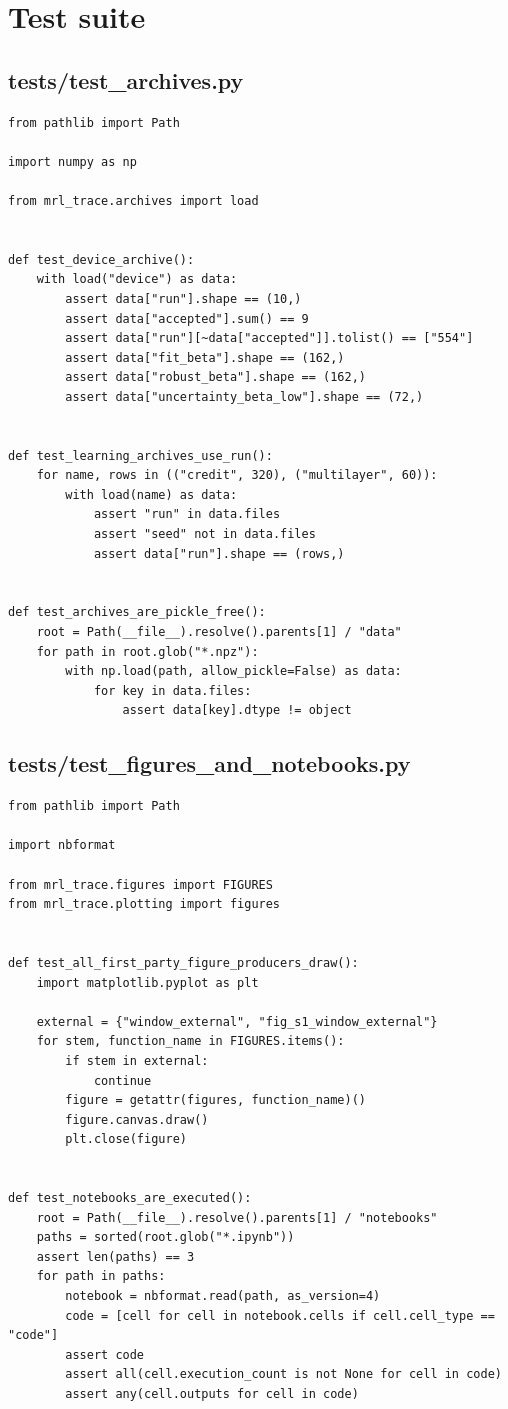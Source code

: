 \documentclass[a4paper,10pt]{article}
\begin{document}
\section{Test suite}
\label{sec:tests}
\subsection{tests/test\_archives.py}
\begin{Verbatim}
from pathlib import Path

import numpy as np

from mrl_trace.archives import load


def test_device_archive():
    with load("device") as data:
        assert data["run"].shape == (10,)
        assert data["accepted"].sum() == 9
        assert data["run"][~data["accepted"]].tolist() == ["554"]
        assert data["fit_beta"].shape == (162,)
        assert data["robust_beta"].shape == (162,)
        assert data["uncertainty_beta_low"].shape == (72,)


def test_learning_archives_use_run():
    for name, rows in (("credit", 320), ("multilayer", 60)):
        with load(name) as data:
            assert "run" in data.files
            assert "seed" not in data.files
            assert data["run"].shape == (rows,)


def test_archives_are_pickle_free():
    root = Path(__file__).resolve().parents[1] / "data"
    for path in root.glob("*.npz"):
        with np.load(path, allow_pickle=False) as data:
            for key in data.files:
                assert data[key].dtype != object
\end{Verbatim}
\subsection{tests/test\_figures\_and\_notebooks.py}
\begin{Verbatim}
from pathlib import Path

import nbformat

from mrl_trace.figures import FIGURES
from mrl_trace.plotting import figures


def test_all_first_party_figure_producers_draw():
    import matplotlib.pyplot as plt

    external = {"window_external", "fig_s1_window_external"}
    for stem, function_name in FIGURES.items():
        if stem in external:
            continue
        figure = getattr(figures, function_name)()
        figure.canvas.draw()
        plt.close(figure)


def test_notebooks_are_executed():
    root = Path(__file__).resolve().parents[1] / "notebooks"
    paths = sorted(root.glob("*.ipynb"))
    assert len(paths) == 3
    for path in paths:
        notebook = nbformat.read(path, as_version=4)
        code = [cell for cell in notebook.cells if cell.cell_type == "code"]
        assert code
        assert all(cell.execution_count is not None for cell in code)
        assert any(cell.outputs for cell in code)
\end{Verbatim}
\end{document}
